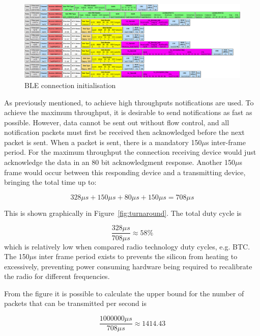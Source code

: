 \documentclass[]{article}
\begin{document}
\begin{figure}[htb]
	\begin{center}
		\includegraphics[width = 1.6\textwidth, angle=90]{connection}
	\end{center}
	\caption{\ac{BLE} connection initialisation}
	\label{fig:connection}
\end{figure}

As previously mentioned, to achieve high throughputs notifications are used. To achieve the maximum throughput, it is desirable to send notifications as fast as possible. However, data cannot be sent out without flow control, and all notification packets must first be received then acknowledged before the next packet is sent. When a packet is sent, there is a mandatory 150$\mu$s inter-frame period. For the maximum throughput the connection receiving device would just acknowledge the data in an 80 bit acknowledgment response. Another 150$\mu$s frame would occur between this responding device and a transmitting device, bringing the total time up to:

\begin{displaymath}
328\mu s + 150\mu s + 80\mu s + 150\mu s = 708\mu s
\end{displaymath}

 This is shown graphically in Figure~\ref{fig:turnaround}. The total duty cycle is 

\begin{displaymath}
\frac{328\mu s}{708\mu s} \approx 58\%
\end{displaymath}
which is relatively low when compared radio technology duty cycles, e.g. \ac{BTC}. The 150$\mu$s inter frame period exists to prevents the silicon from heating to excessively, preventing power consuming hardware being required to recalibrate the radio for different frequencies. 

From the figure it is possible to calculate the upper bound for the number of packets that can be transmitted per second is

\begin{displaymath}\frac{1000000\mu s}{708\mu s} \approx  1414.43\end{displaymath}
\end{document}
